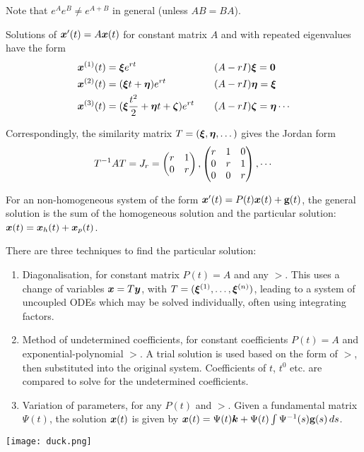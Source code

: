 \begin{remark}
	Note that $e^Ae^B \neq e^{A+B}$ in general (unless $AB = BA$).
\end{remark}

Solutions of $\bm{x}'(t) = A\bm{x}(t)$ for constant matrix $A$ and with repeated eigenvalues have the form
\begin{equation*}
	\begin{alignedat}{2}
		\bm{x}^{(1)}(t) &= \bm{\xi} e^{rt} \qquad &&(A-rI)\bm{\xi} = \bm{0} \\
		\bm{x}^{(2)}(t) &= (\bm{\xi} t + \bm{\eta})e^{rt} \qquad && (A-rI)\bm{\eta} = \bm{\xi} \\
		\bm{x}^{(3)}(t) &= (\bm{\xi} \frac{t^2}{2} + \bm{\eta} t + \bm{\zeta})e^{rt} \qquad &&(A-rI)\bm{\zeta} = \bm{\eta} \cdots
	\end{alignedat}
\end{equation*}

Correspondingly, the similarity matrix $T = (\bm{\xi}, \bm{\eta}, \dots)$ gives the Jordan form
\[
T^{-1}AT = J_r = \begin{pmatrix}r & 1 \\ 0 & r\end{pmatrix}, \begin{pmatrix}r & 1 & 0 \\ 0 & r & 1 \\ 0 & 0 & r\end{pmatrix}, \cdots
\]

For an non-homogeneous system of the form $\bm{x}'(t) = P(t)\bm{x}(t) + \textbf{g}(t)$, the general solution is the sum of the homogeneous solution and the particular solution: $\bm{x}(t) = \bm{x}_h(t) + \bm{x}_p(t)$.

There are three techniques to find the particular solution:
\begin{enumerate}
	\item Diagonalisation, for constant matrix $P(t)=A$ and any $\gt$. This uses a change of variables $\bm{x} = T\bm{y}$, with $T = (\bm{\xi} ^{(1)}, \ldots, \bm{\xi} ^{(n)})$, leading to a system of uncoupled ODEs which may be solved individually, often using integrating factors.
	\item Method of undetermined coefficients, for constant coefficients $P(t)=A$ and exponential-polynomial $\gt$. A trial solution is used based on the form of $\gt$, then substituted into the original system. Coefficients of $t$, $t^0$ etc. are compared to solve for the undetermined coefficients.
	\item Variation of parameters, for any $P(t)$ and $\gt$. Given a fundamental matrix $\Psi(t)$, the solution $\bm{x}(t)$ is given by $\bm{x}(t) = \Psi(t)\bm{k} + \Psi(t) \int \Psi^{-1}(s) \textbf{g}(s)\,ds$.
\end{enumerate}

\vfill
\texttt{[image: duck.png]}
